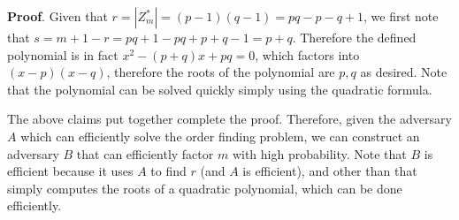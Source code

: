 \documentclass{article}
\begin{document}
\begin{enumerate}[noitemsep,topsep=\mdcompacttopsep]
\begin{mdbmarginx}{1ex}{0pt}{1ex}{0pt}%
\noindent{}\textbf{Proof}.  Given that $r = |Z_m^*| = (p-1)(q-1) = pq - p - q + 1$, we first note that $s = m + 1 - r = pq + 1 - pq + p + q - 1 = p + q$. 
Therefore the defined polynomial is in fact $x^2 - (p+q)x + pq = 0$, which factors into $(x-p)(x-q)$,
therefore the roots of the polynomial are $p,q$ as desired. Note that the polynomial can be solved
quickly simply using the quadratic formula.  
\mdfloatright{\ensuremath{\Box}}%
\end{mdbmarginx}%
The above claims put together complete the proof. Therefore, given the adversary $A$ which can efficiently
solve the order finding problem, we can construct an adversary $B$ that can efficiently factor $m$
with high probability. Note that $B$ is efficient because it uses $A$ to find $r$ (and $A$ is efficient),
and other than that simply computes the roots of a quadratic polynomial, which can be done efficiently.%
\end{enumerate}%
\end{document}
